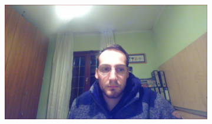 \documentclass[paper=a4, fontsize=10pt]{scrartcl}	%
\begin{document}
\begin{figure}[H]
\begin{subfigure}{0.2\textwidth}
		\end{subfigure}%
		\begin{subfigure}{0.2\textwidth}
			\includegraphics[width=\linewidth]{images/heatmap/img_mean/img_man9.jpg}
		\end{subfigure}
	

\end{figure}
\end{document}
